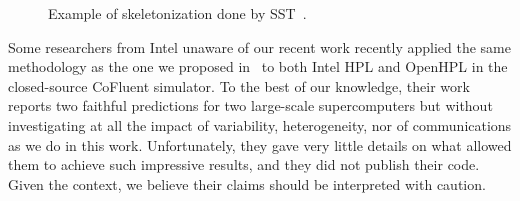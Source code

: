        \begin{figure}[tpb]
            \centering
            \caption{Example of skeletonization done by SST~\cite{sst_skeleton}.}%
            \label{fig:sst_skeleton}
        \end{figure}

        Some researchers from Intel unaware of our recent work recently applied the same methodology as the one we
        proposed in~\cite{cornebize:cluster19} to both Intel HPL and OpenHPL in the closed-source CoFluent
        simulator\cite{intel_20}. To the best of our knowledge, their work reports two faithful predictions for two
        large-scale supercomputers but without investigating at all the impact of variability, heterogeneity, nor of
        communications as we do in this work. Unfortunately, they gave very little details on what allowed them to
        achieve such impressive results, and they did not publish their code. Given the context, we believe their claims
        should be interpreted with caution.

